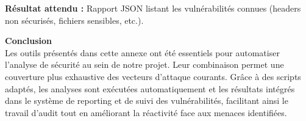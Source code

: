 \begin{justify}
\begin{enumerate}[left=0cm]
        \textbf{Résultat attendu :}
        Rapport JSON listant les vulnérabilités connues (headers non sécurisés, fichiers sensibles, etc.).
\end{enumerate}

\vspace{0.3cm}
{\fontsize{14}{17}\selectfont 
 \textbf{Conclusion}} \\
Les outils présentés dans cette annexe ont été essentiels pour automatiser l’analyse de sécurité au sein de notre projet. Leur combinaison permet une couverture plus exhaustive des vecteurs d’attaque courants. Grâce à des scripts adaptés, les analyses sont exécutées automatiquement et les résultats intégrés dans le système de reporting et de suivi des vulnérabilités, facilitant ainsi le travail d'audit tout en améliorant la réactivité face aux menaces identifiées.
\end{justify}
